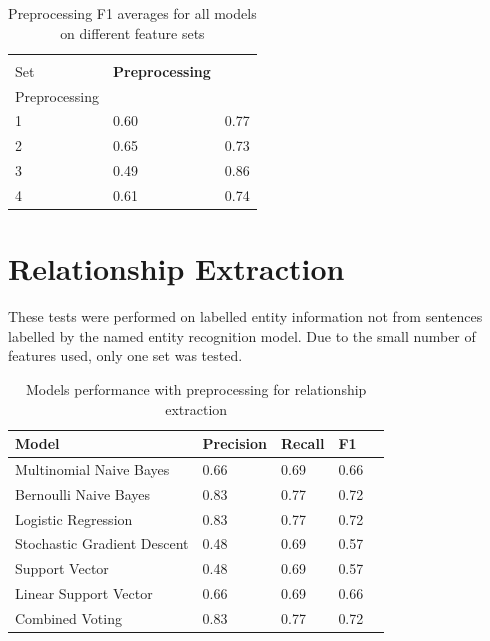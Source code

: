 \documentclass[11pt,oneside]{book}
\begin{document}
\begin{longtable}[c]{|l|l|l|}
\caption{Preprocessing F1 averages for all models on different feature sets}
\label{tab:ner_preprocessing}\\
\hline
\textbf{\begin{tabular}[c]{@{}l@{}}Feature \\ Set\end{tabular}} & \textbf{Preprocessing} & \textbf{\begin{tabular}[c]{@{}l@{}}No\\ Preprocessing\end{tabular}} \\ \hline
\endfirsthead
%
\endhead
%
1 & 0.60 & 0.77 \\ \hline
2 & 0.65 & 0.73 \\ \hline
3 & 0.49 & 0.86 \\ \hline
4 & 0.61 & 0.74 \\ \hline
\end{longtable}

\section{Relationship Extraction}

These tests were performed on labelled entity information not from sentences labelled by the named entity recognition model. Due to the small number of features used, only one set was tested.

\begin{longtable}{|l|l|l|l|l|}
\caption{Models performance with preprocessing for relationship extraction}
\label{tab:re_feature_set_1}\\
\hline
\textbf{Model}          & \multicolumn{1}{c|}{\textbf{Precision}} & \multicolumn{1}{c|}{\textbf{Recall}} & \textbf{F1} \\ \hline
\endfirsthead
%
\endhead
%
Multinomial Naive Bayes &  0.66  & 0.69  & 0.66  \\ \hline
Bernoulli Naive Bayes       & 0.83 & 0.77 & 0.72  \\ \hline
Logistic Regression         & 0.83 & 0.77 & 0.72  \\ \hline
Stochastic Gradient Descent & 0.48 & 0.69 & 0.57  \\ \hline
Support Vector              & 0.48 & 0.69 & 0.57  \\ \hline
Linear Support Vector       & 0.66 & 0.69 & 0.66  \\ \hline
Combined Voting             & 0.83 & 0.77 & 0.72  \\ \hline
\end{longtable}
\end{document}
